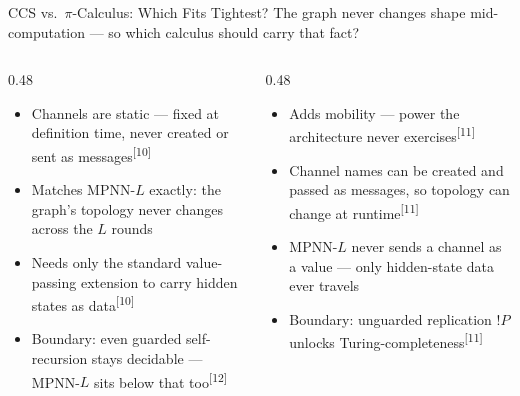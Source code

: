 \documentclass[10pt,aspectratio=169,draft]{beamer}
\newcommand{\pcite}[1]{\textsuperscript{[#1]}}
\begin{document}
\begin{frame}{CCS vs.\ $\pi$-Calculus: Which Fits Tightest?}
  The graph never changes shape mid-computation --- so which calculus should carry that fact?
  \vspace{0.2cm}
  \begin{columns}[T]
    \begin{column}{0.48\textwidth}
      \begin{itemize}
        \small
        \item Channels are static --- fixed at definition time, never created or sent as messages\pcite{10}
        \item Matches MPNN-$L$ exactly: the graph's topology never changes across the $L$ rounds
        \item Needs only the standard value-passing extension to carry hidden states as data\pcite{10}
        \item Boundary: even guarded self-recursion stays decidable --- MPNN-$L$ sits below that too\pcite{12}
      \end{itemize}
    \end{column}
    \begin{column}{0.48\textwidth}
      \begin{itemize}
        \small
        \item Adds mobility --- power the architecture never exercises\pcite{11}
        \item Channel names can be created and passed as messages, so topology can change at runtime\pcite{11}
        \item MPNN-$L$ never sends a channel as a value --- only hidden-state data ever travels
        \item Boundary: unguarded replication $!P$ unlocks Turing-completeness\pcite{11}
      \end{itemize}
    \end{column}
  \end{columns}
  \vspace{0.3cm}
  {\footnotesize{}}
\end{frame}
\end{document}
